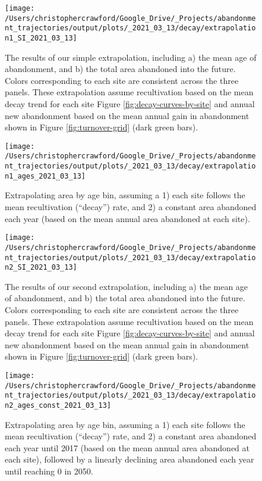 \documentclass[9pt,twocolumn,twoside,lineno]{pnas-new}
\begin{document}
\begin{figure}
\texttt{[image: /Users/christophercrawford/Google\_Drive/\_Projects/abandonment\_trajectories/output/plots/\_2021\_03\_13/decay/extrapolation1\_SI\_2021\_03\_13]} \caption{The results of our simple extrapolation, including a) the mean age of abandonment, and b) the total area abandoned into the future. Colors corresponding to each site are consistent across the three panels. These extrapolation assume recultivation based on the mean decay trend for each site Figure \ref{fig:decay-curves-by-site} and annual new abandonment based on the mean annual gain in abandonment shown in Figure \ref{fig:turnover-grid} (dark green bars).}\label{fig:extrapolation-combo}
\end{figure}



\begin{figure}
\texttt{[image: /Users/christophercrawford/Google\_Drive/\_Projects/abandonment\_trajectories/output/plots/\_2021\_03\_13/decay/extrapolation1\_ages\_2021\_03\_13]} \caption{Extrapolating area by age bin, assuming a 1) each site follows the mean recultivation (``decay'') rate, and 2) a constant area abandoned each year (based on the mean annual area abandoned at each site).}\label{fig:extrapolation-area-by-age}
\end{figure}



\begin{figure}
\texttt{[image: /Users/christophercrawford/Google\_Drive/\_Projects/abandonment\_trajectories/output/plots/\_2021\_03\_13/decay/extrapolation2\_SI\_2021\_03\_13]} \caption{The results of our second extrapolation, including a) the mean age of abandonment, and b) the total area abandoned into the future. Colors corresponding to each site are consistent across the three panels. These extrapolation assume recultivation based on the mean decay trend for each site Figure \ref{fig:decay-curves-by-site} and annual new abandonment based on the mean annual gain in abandonment shown in Figure \ref{fig:turnover-grid} (dark green bars).}\label{fig:extrapolation2-combo}
\end{figure}



\begin{figure}
\texttt{[image: /Users/christophercrawford/Google\_Drive/\_Projects/abandonment\_trajectories/output/plots/\_2021\_03\_13/decay/extrapolation2\_ages\_const\_2021\_03\_13]} \caption{Extrapolating area by age bin, assuming a 1) each site follows the mean recultivation (``decay'') rate, and 2) a constant area abandoned each year until 2017 (based on the mean annual area abandoned at each site), followed by a linearly declining area abandoned each year until reaching 0 in 2050.}\label{fig:extrapolation2-area-by-age}
\end{figure}
\end{document}

